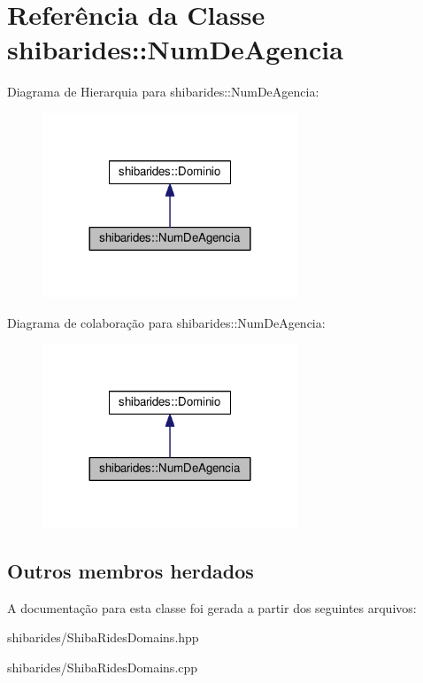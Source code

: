 \hypertarget{classshibarides_1_1NumDeAgencia}{}\section{Referência da Classe shibarides\+:\+:Num\+De\+Agencia}
\label{classshibarides_1_1NumDeAgencia}


Diagrama de Hierarquia para shibarides\+:\+:Num\+De\+Agencia\+:\nopagebreak
\begin{figure}[H]
\begin{center}
\leavevmode
\includegraphics[width=216pt]{classshibarides_1_1NumDeAgencia__inherit__graph}
\end{center}
\end{figure}


Diagrama de colaboração para shibarides\+:\+:Num\+De\+Agencia\+:\nopagebreak
\begin{figure}[H]
\begin{center}
\leavevmode
\includegraphics[width=216pt]{classshibarides_1_1NumDeAgencia__coll__graph}
\end{center}
\end{figure}
\subsection*{Outros membros herdados}


A documentação para esta classe foi gerada a partir dos seguintes arquivos\+:\begin{DoxyCompactItemize}
\item 
shibarides/Shiba\+Rides\+Domains.\+hpp\item 
shibarides/Shiba\+Rides\+Domains.\+cpp\end{DoxyCompactItemize}
